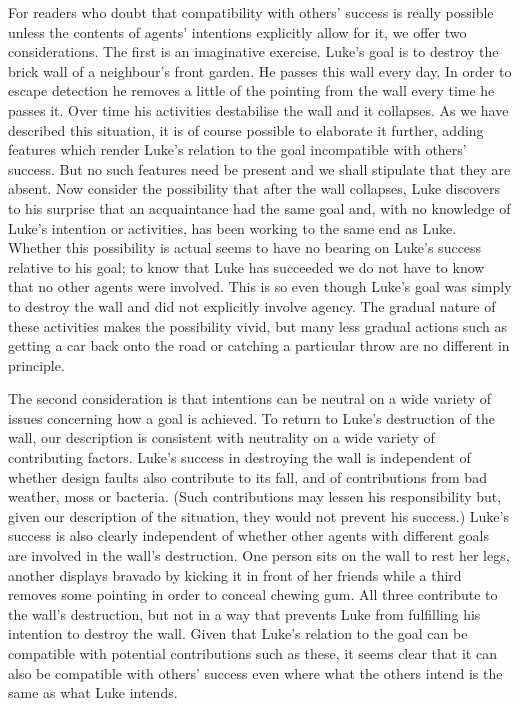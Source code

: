 \documentclass[12pt,a4paper]{extarticle}
\begin{document}
For readers who doubt that compatibility with others' success is really possible unless the contents of agents' intentions explicitly allow for it, we offer two considerations.
The first is an imaginative exercise.  
Luke's goal is to destroy the brick wall of a neighbour's front garden.  
He passes this wall every day.  
In order to escape detection he removes a little of the pointing from the wall every time he passes it.  
Over time his activities destabilise the wall and it collapses.  
As we have described this situation, it is of course possible to elaborate it further, adding features which render Luke's relation to the goal incompatible with others' success.
But no such features need be present and we shall stipulate that they are absent.
Now consider the possibility that after the wall collapses, Luke discovers to his surprise that an acquaintance had the same goal and, with no knowledge of Luke's intention or activities, has been working to the same end as Luke.
Whether this possibility is actual seems to have no bearing on Luke's success relative to his goal; to know that Luke has succeeded we do not have to know that no other agents were involved.
This is so even though Luke's goal was simply to destroy the wall and did not explicitly involve agency.
The gradual nature of these activities makes the possibility vivid, but many less gradual actions such as getting a car back onto the road or catching a particular throw are no different in principle.

The second consideration is that intentions can be neutral on a wide variety of issues concerning how a goal is achieved.  
To return to Luke's destruction of the wall, our description is consistent with neutrality on a wide variety of contributing factors.
Luke's success in destroying the wall is independent of whether design faults also contribute to its fall, and of contributions from bad weather, moss or bacteria.
(Such contributions may lessen his responsibility but, given our description of the situation, they would not prevent his success.)
Luke's success is also clearly independent of whether other agents with different goals are involved in the wall's destruction.  
One person sits on the wall to rest her legs, another displays bravado by kicking it in front of her friends while a third removes some pointing in order to conceal chewing gum.
All three contribute to the wall's destruction, but not in a way that prevents Luke from fulfilling his intention to destroy the wall.
Given that Luke's relation to the goal can be compatible with potential contributions such as these, it seems clear that it can also be compatible with others' success even where what the others intend is the same as what Luke intends.
\end{document}
